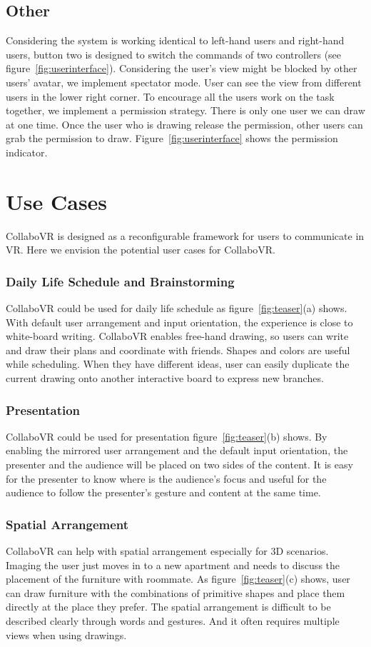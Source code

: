 \documentclass{sigchi}
\begin{document}
\subsection{Other}
Considering the system is working identical to left-hand users and right-hand users, button two is designed to switch the commands of two controllers (see figure~\ref{fig:userinterface}). Considering the user's view might be blocked by other users' avatar, we implement spectator mode. User can see the view from different users in the lower right corner. To encourage all the users work on the task together, we implement a permission strategy. There is only one user we can draw at one time. Once the user who is drawing release the permission, other users can grab the permission to draw. Figure~\ref{fig:userinterface} shows the permission indicator.

\section{Use Cases}
CollaboVR is designed as a reconfigurable framework for users to communicate in VR. Here we envision the potential user cases for CollaboVR.

\subsubsection{Daily Life Schedule and Brainstorming}
CollaboVR could be used for daily life schedule as figure~\ref{fig:teaser}(a) shows. With default user arrangement and input orientation, the experience is close to white-board writing. CollaboVR enables free-hand drawing, so users can write and draw their plans and coordinate with friends. Shapes and colors are useful while scheduling. When they have different ideas, user can easily duplicate the current drawing onto another interactive board to express new branches.

\subsubsection{Presentation}
CollaboVR could be used for presentation figure~\ref{fig:teaser}(b) shows. By enabling the mirrored user arrangement and the default input orientation, the presenter and the audience will be placed on two sides of the content. It is easy for the presenter to know where is the audience's focus and useful for the audience to follow the presenter's gesture and content at the same time.

\subsubsection{Spatial Arrangement}
CollaboVR can help with spatial arrangement especially for 3D scenarios. Imaging the user just moves in to a new apartment and needs to discuss the placement of the furniture with roommate. As figure~\ref{fig:teaser}(c) shows, user can draw furniture with the combinations of primitive shapes and place them directly at the place they prefer. The spatial arrangement is difficult to be described clearly through words and gestures. And it often requires multiple views when using drawings.
\end{document}
